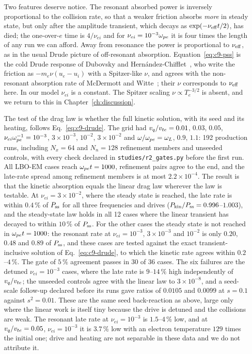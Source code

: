 Two features deserve notice. The resonant absorbed power is inversely proportional to the collision rate, so that a weaker friction absorbs \emph{more} in steady state, but only after the amplitude transient, which decays as $\exp(-\nu_{\rm eff}t/2)$, has died; the one-over-$e$ time is $4/\nu_{ei}$ and for $\nu_{ei}=10^{-3}\omega_{pe}$ it is four times the length of any run we can afford. Away from resonance the power is proportional to $\nu_{\rm eff}$, as in the usual Drude picture of off-resonant absorption. Equation~\eqref{eq:c9-pss} is the cold Drude response of Dubovsky and Hern\'andez-Chifflet~\cite{DubovskyHC2015}, who write the friction as $-m_e\nu(u_e-u_i)$ with a Spitzer-like $\nu$, and agrees with the non-resonant absorption rate of McDermott and Witte~\cite{McDermottWitte2020}; their $\nu$ corresponds to $\nu_{\rm eff}$ here. In our model $\nu_{ei}$ is a constant. The Spitzer scaling $\nu\propto T_e^{-3/2}$ is absent, and we return to this in Chapter~\ref{ch:discussion}.


The test of the drag law is whether the full kinetic solution, with its seed and its heating, follows Eq.~\eqref{eq:c9-drude}. The grid had $v_q/v_{te}=0.01$, $0.03$, $0.05$, $\nu_{ei}\omega_{pe}^{-1}=10^{-3}$, $3\times10^{-3}$, $10^{-2}$, $3\times10^{-2}$ and $\omega/\omega_{pe}=\omega_L$, $0.9$, $1.1$: 192 production runs, including $N_x=64$ and $N_n=128$ refinement members and unseeded controls, with every check declared in \texttt{studies/r2\_gates.py} before the first run. All LBO-EM cases reach $\omega_{pe} t=1000$, refinement pairs agree to the end, and the late-rate spread among refinement members is at most $2.2\times10^{-4}$. The result is that the kinetic absorption equals the linear drag law wherever the law is testable. At $\nu_{ei}=3\times10^{-2}$, where the steady state is reached, the late rate is within $0.4\,\%$ of $P_{\rm ss}$ for all three frequencies and drives ($P_{\rm kin}/P_{\rm ss}=0.996$--$1.003$), and the steady-state law holds in all 12 cases where the linear transient has decayed to within $10\,\%$ of $P_{\rm ss}$. For the other cases the steady state is not reached in $\omega_{pe} t=1000$: the resonant rate at $\nu_{ei}=10^{-3}$, $3\times10^{-3}$ and $10^{-2}$ is only $0.20$, $0.48$ and $0.89$ of $P_{\rm ss}$, and these cases are tested against the exact transient-inclusive solution of Eq.~\eqref{eq:c9-drude}, to which the kinetic rate agrees within $0.2$--$4\,\%$. The gate of $5\,\%$ agreement passes in $30$ of $36$ cases. The six failures are the detuned $\nu_{ei}=10^{-3}$ cases, where the late rate is $9$--$14\,\%$ high independently of $v_q/v_{te}$; the unseeded controls agree with the linear law to $3\times10^{-8}$, and a seed-scale follow-up declared before its runs gave ratios of $0.0105$ and $0.0099$ at $s=0.1$ against $s^2=0.01$. These are the same seed back-reaction as above, large only where the linear work is itself tiny because the drive is detuned and the collisions are weak. The resonant late rate at $\nu_{ei}=10^{-3}$ is $1.5$--$4\,\%$ low, and at $v_q/v_{te}=0.05$, $\nu_{ei}=10^{-3}$ it is $3.7\,\%$ low with an electron temperature $129$ times the initial one; drive and heating are not separable in these data and we do not attribute it.


